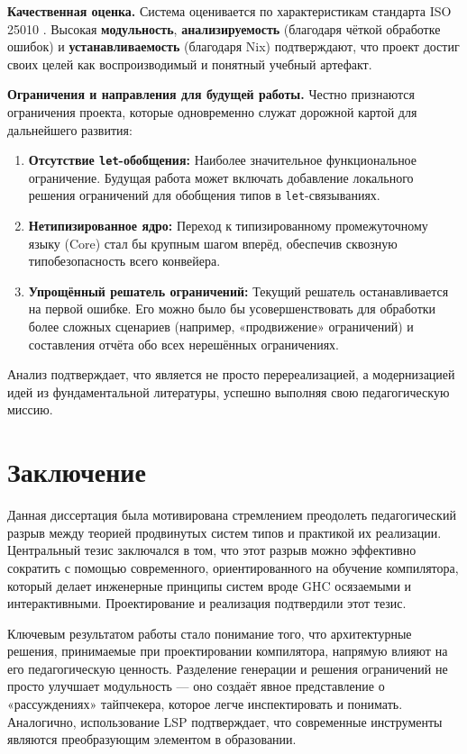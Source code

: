 \textbf{Качественная оценка.} Система оценивается по характеристикам стандарта ISO 25010 \cite{iso-25010}. Высокая \textbf{модульность}, \textbf{анализируемость} (благодаря чёткой обработке ошибок) и \textbf{устанавливаемость} (благодаря Nix) подтверждают, что проект достиг своих целей как воспроизводимый и понятный учебный артефакт.

\textbf{Ограничения и направления для будущей работы.} Честно признаются ограничения проекта, которые одновременно служат дорожной картой для дальнейшего развития:
\begin{enumerate}
    \item \textbf{Отсутствие \texttt{let}-обобщения:} Наиболее значительное функциональное ограничение. Будущая работа может включать добавление локального решения ограничений для обобщения типов в \texttt{let}-связываниях.
    \item \textbf{Нетипизированное ядро:} Переход к типизированному промежуточному языку (Core) стал бы крупным шагом вперёд, обеспечив сквозную типобезопасность всего конвейера.
    \item \textbf{Упрощённый решатель ограничений:} Текущий решатель останавливается на первой ошибке. Его можно было бы усовершенствовать для обработки более сложных сценариев (например, «продвижение» ограничений) и составления отчёта обо всех нерешённых ограничениях.
\end{enumerate}

Анализ подтверждает, что \Arralac является не просто перереализацией, а модернизацией идей из фундаментальной литературы, успешно выполняя свою педагогическую миссию.

\newpage

\section*{Заключение}

Данная диссертация была мотивирована стремлением преодолеть педагогический разрыв между теорией продвинутых систем типов и практикой их реализации. Центральный тезис заключался в том, что этот разрыв можно эффективно сократить с помощью современного, ориентированного на обучение компилятора, который делает инженерные принципы систем вроде GHC осязаемыми и интерактивными. Проектирование и реализация \Arralac подтвердили этот тезис.

Ключевым результатом работы стало понимание того, что архитектурные решения, принимаемые при проектировании компилятора, напрямую влияют на его педагогическую ценность. Разделение генерации и решения ограничений не просто улучшает модульность — оно создаёт явное представление о «рассуждениях» тайпчекера, которое легче инспектировать и понимать. Аналогично, использование LSP подтверждает, что современные инструменты являются преобразующим элементом в образовании.

